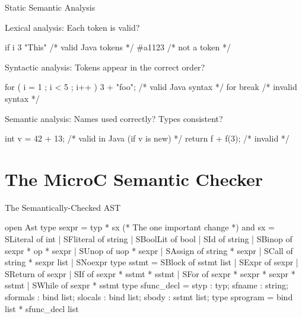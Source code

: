 \documentclass{plt}
\begin{document}
\begin{frame}[fragile]{Static Semantic Analysis}

Lexical analysis: Each token is valid?

\begin{java}
if i 3 "This"                /* valid Java tokens */
#a1123                       /* not a token */
\end{java}

Syntactic analysis: Tokens appear in the correct order?

\begin{java}
for ( i = 1 ; i < 5 ; i++ ) 3 + "foo";  /* valid Java syntax */
for break                               /* invalid syntax */
\end{java}

Semantic analysis: Names used correctly? Types consistent?

\begin{java}
int v = 42 + 13;    /* valid in Java (if v is new) */
return f + f(3);    /* invalid */
\end{java}

\end{frame}


\part{The MicroC Semantic Checker}

\begin{frame}[fragile=singleslide]{The Semantically-Checked AST}
\begin{ocaml}
open Ast
type sexpr = typ * sx    (* The one important change *)
and sx = SLiteral  of int
       | SFliteral of string
       | SBoolLit  of bool
       | SId       of string
       | SBinop    of sexpr * op * sexpr
       | SUnop     of uop * sexpr
       | SAssign   of string * sexpr
       | SCall     of string * sexpr list
       | SNoexpr
type sstmt = SBlock  of sstmt list
           | SExpr   of sexpr
           | SReturn of sexpr
           | SIf     of sexpr * sstmt * sstmt
           | SFor    of sexpr * sexpr * sexpr * sstmt
           | SWhile  of sexpr * sstmt
type sfunc_decl = { styp     : typ;
                    sfname   : string;
                    sformals : bind list;
                    slocals  : bind list;
                    sbody    : sstmt list; }
type sprogram = bind list * sfunc_decl list
\end{ocaml}
\end{frame}
\end{document}
